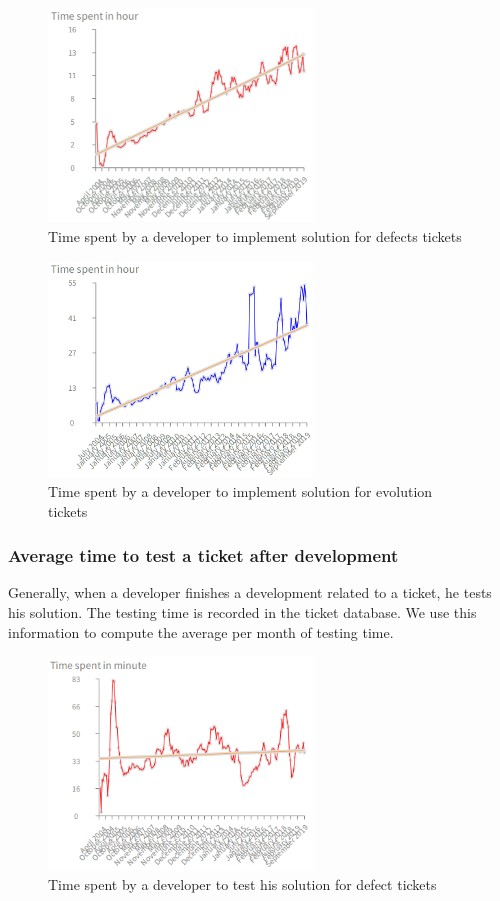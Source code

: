 \documentclass[10pt,conference]{IEEEtran}
\begin{document}
\begin{figure}[H]
  \centering
  \includegraphics[width=70mm]{./images/devDefect.png}
  \caption{Time spent by a developer to implement solution for  defects tickets}
  \label{fig:devTimeDefect}
\end{figure}

\begin{figure}[H]
  \centering
  \includegraphics[width=70mm]{./images/devEvol.png}
  \caption{Time spent by a developer to implement solution for  evolution tickets}
  \label{fig:devTimeEvol}
\end{figure}

\subsubsection{Average time  to test a ticket after development}

Generally, when a developer finishes a development related to a ticket, he tests his solution.  
The testing time is recorded in the ticket database.
 We use this information to compute the average per month of testing time. 

 \begin{figure}[H]
  \centering
  \includegraphics[width=70mm]{./images/timeDevTest.png}
  \caption{Time spent by a developer to test his solution for  defect tickets}
  \label{fig:devTimeTestBug}
\end{figure}
\end{document}
